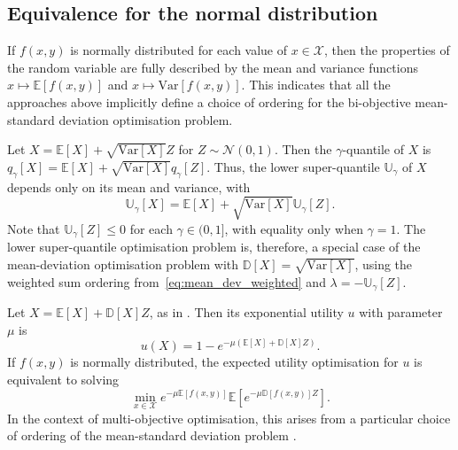 \documentclass[main.tex]{subfiles}
\begin{document}
\subsection{Equivalence for the normal distribution}
If $f(x,y)$ is normally distributed for each value of
$x\in\mathcal{X}$, then the properties of the random variable are fully
described by the mean and variance functions $x\mapsto
\mathbb{E}[f(x,y)]$ and $x\mapsto \mbox{Var}[f(x,y)]$. This
indicates that all the approaches above implicitly define a
choice of ordering for the bi-objective mean-standard deviation
optimisation problem.

\begin{example}\label{ex:avar_normal}
  Let $X=\mathbb{E}[X]+ \sqrt{\mbox{Var}[X]} Z$ for $Z\sim\mathcal{N}(0,1)$.
  Then the $\gamma$-quantile of $X$ is
  $q_\gamma[X] = \mathbb{E}[X] + \sqrt{\mbox{Var}[X]} q_\gamma[Z]$.
  Thus, the lower super-quantile $\mathbb{U}_\gamma$ of $X$ depends only on
  its mean and variance, with
  \begin{equation}
    \mathbb{U}_\gamma[X] =  \mathbb{E}[X]
    + \sqrt{\mbox{Var}[X]} \mathbb{U}_\gamma[Z].
  \end{equation}
  Note that $\mathbb{U}_\gamma[Z]\leq 0$ for each $\gamma\in(0,1]$,
  with equality only when $\gamma=1$.
  The lower super-quantile optimisation problem is, therefore,
  a special case of the mean-deviation optimisation problem
  with $\mathbb{D}[X]=\sqrt{\mbox{Var}[X]}$,
  using the weighted sum ordering from~\eqref{eq:mean_dev_weighted} and
  $\lambda = -\mathbb{U}_\gamma[Z]$.
\end{example}

\begin{example}
  Let $X=\mathbb{E}[X]+ \mathbb{D}[X] Z$, as in .
  Then its exponential utility $u$ with parameter $\mu$
  is
  \begin{equation}
    u(X) = 1 - e^{-\mu (\mathbb{E}[X] +
      \mathbb{D}[X] Z)}.
  \end{equation}
  If $f(x,y)$ is normally distributed, the expected utility
  optimisation for $u$ is equivalent to solving
  \begin{equation}
    \min_{x\in\mathcal{X}}  e^{-\mu\mathbb{E}[f(x,y)]}
    \mathbb{E} \left[ e^{-\mu \mathbb{D}[f(x,y)] Z} \right].
  \end{equation}
  In the context of multi-objective optimisation, this arises from
  a particular choice of ordering of the mean-standard deviation
  problem \citep{marler2004survey}.
\end{example}
\end{document}
